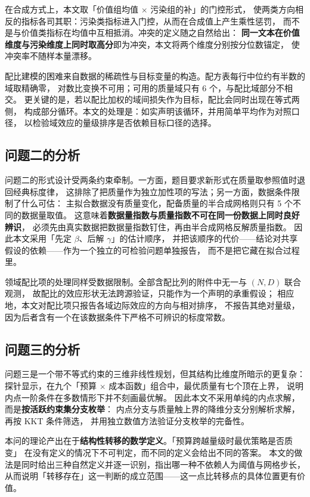 在合成方式上，本文取「价值组均值 $\times$ 污染组的补」的门控形式，
使两类方向相反的指标各司其职：污染类指标进入门控，从而在合成值上产生乘性惩罚，
而不是与价值类指标在均值中互相抵消。冲突的定义随之自然给出：
\textbf{同一文本在价值维度与污染维度上同时取高分}即为冲突，本文将两个维度分别按分位数锚定，
使冲突率不随样本量漂移。

配比建模的困难来自数据的稀疏性与目标变量的构造。配方表每行中位约有半数的域取精确零，
对数比变换不可用；可用的质量域只有 6 个，与配比域部分不相交。
更关键的是，若以配比加权的域间损失作为目标，配比会同时出现在等式两侧，
构成部分循环。本文的处理是：如实声明该循环，并用简单平均作为对照口径，
以检验域效应的量级排序是否依赖目标口径的选择。

\subsection{问题二的分析}
问题二的形式设计受两条约束牵制。一方面，题目要求新形式在质量取参照值时退回经典标度律，
这排除了把质量作为独立加性项的写法；另一方面，数据条件限制了什么可估：
主拟合数据没有质量变化，配备质量的半合成网格则只有 5 个不同的数据量取值。
这意味着\textbf{数据量指数与质量指数不可在同一份数据上同时良好辨识}，
必须先由真实数据把数据量指数钉住，再由半合成网格反解质量指数。
因此本文采用「先定 $\beta$、后解 $\gamma$」的估计顺序，
并把该顺序的代价——结论对共享假设的依赖——作为一个独立的可检验问题单独报告，
而不是把它藏在拟合过程里。

领域配比项的处理同样受数据限制。全部含配比列的附件中无一与 $(N,D)$ 联合观测，
故配比的效应形状无法跨源验证，只能作为一个声明的承重假设；
相应地，本文对配比项只报告各域边际效应的方向与相对排序，
不报告其绝对量级，因为后者含有一个在该数据条件下严格不可辨识的标度常数。

\subsection{问题三的分析}
问题三是一个带不等式约束的三维非线性规划，但其结构比维度所暗示的更复杂：
探针显示，在九个「预算 $\times$ 成本函数」组合中，最优质量有七个顶在上界，
说明内点一阶条件在多数情形下并不刻画最优解。
因此本文不采用单纯的内点求解，而是\textbf{按活跃约束集分支枚举}：
内点分支与质量触上界的降维分支分别解析求解，再按 KKT 条件筛选，
并用独立数值方法验证分支枚举的完备性。

本问的理论产出在于\textbf{结构性转移的数学定义}。「预算跨越量级时最优策略是否质变」
在没有定义的情况下不可判定，而不同的定义会给出不同的答案。
本文的做法是同时给出三种自然定义并逐一识别，指出哪一种不依赖人为阈值与网格步长，
从而说明「转移存在」这一判断的成立范围——这一点比转移点的具体位置更有价值。

